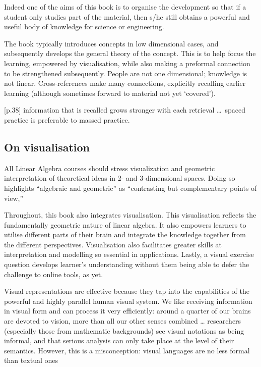 Indeed one of the aims of this book is to organise the development so that if a student only studies part of the material, then s/he still obtains a powerful and useful body of knowledge for science or engineering.


The book typically introduces concepts in low dimensional cases, and subsequently develops the general theory of the concept.  
This is to help focus the learning, empowered by visualisation, while also making a preformal connection to be strengthened subsequently.
People are not one dimensional; knowledge is not linear.
Cross-references make many connections, explicitly recalling earlier learning (although sometimes forward to material not yet `covered').
\begin{quoted}{\cite{Halpern2003} [p.38]}
information that is recalled grows stronger with each retrieval \ldots\ spaced practice is preferable to massed practice.
\end{quoted}




\subsection*{On visualisation}

\begin{quoted}{\cite[p.38]{CUPMguide2015}}
All Linear Algebra courses should stress visualization and geometric interpretation of theoretical ideas in 2- and 3-dimensional spaces. Doing so highlights ``algebraic and geometric'' as ``contrasting but complementary points of view,''
\end{quoted}

Throughout, this book also integrates visualisation.
This visualisation reflects the fundamentally geometric nature of linear algebra.  
It also empowers learners to utilise different parts of their brain and integrate the knowledge together from the different perspectives.
Visualisation also facilitates greater skills at interpretation and modelling so essential in applications.
Lastly, a visual exercise question develops learner's understanding without them being able to defer the challenge to online tools, as yet.  

\begin{quoted}{\cite{Moody2009}}
Visual representations are effective because they tap into the capabilities of the powerful and highly parallel human visual system.
We like receiving information in visual form and can process it very efficiently: around a quarter of our brains are devoted to vision, more than all our other senses combined  \ldots
researchers (especially those from mathematic backgrounds) see visual notations as being informal, and that serious analysis can only take place at the level of their semantics. 
However, this is a misconception: visual languages are no less formal than textual ones
\end{quoted}









